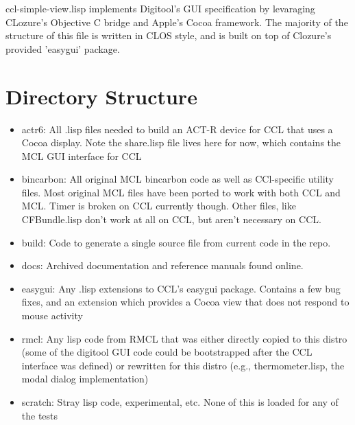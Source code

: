 \documentclass[12pt]{article} %
\begin{document}
ccl-simple-view.lisp implements Digitool's GUI specification by levaraging CLozure's Objective C bridge and Apple's Cocoa framework. The majority of the structure of this file is written in CLOS style, and is built on top of Clozure's provided 'easygui' package. 


\section{Directory Structure} %

\begin{itemize}

\item actr6: All .lisp files needed to build an ACT-R device for CCL that uses a Cocoa display. Note the share.lisp file lives here for now, which contains the MCL GUI interface for CCL

\item bincarbon:
  All original MCL bincarbon code as well as CCl-specific utility files. 
  Most original MCL files have been ported to work with both CCL and MCL.
  Timer is broken on CCL currently though.
  Other files, like CFBundle.lisp don't work at all on CCL, but aren't necessary on CCL.

\item build: Code to generate a single source file from current code in the repo.

\item docs: Archived documentation and reference manuals found online.

\item easygui: Any .lisp extensions to CCL's easygui package. Contains a few bug fixes, and an extension which provides a Cocoa view that does not respond to mouse activity	
\item rmcl: Any lisp code from RMCL that was either directly copied to this distro (some of the digitool GUI code could be bootstrapped after the CCL interface was defined) or rewritten for this distro (e.g., thermometer.lisp, the modal dialog implementation)

\item scratch: Stray lisp code, experimental, etc. None of this is loaded for any of the tests


\end{itemize}
\end{document}
